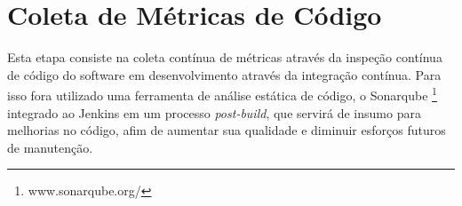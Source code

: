 \section{Coleta de Métricas de Código}
Esta etapa consiste na coleta contínua de métricas através da inspeção contínua de código do software em desenvolvimento através da integração contínua. Para isso fora utilizado uma ferramenta de análise estática de código, o Sonarqube \footnote{www.sonarqube.org/} integrado ao Jenkins em um processo \textit{post-build}, que servirá de insumo para melhorias no código, afim de aumentar sua qualidade e diminuir esforços futuros de manutenção. 

